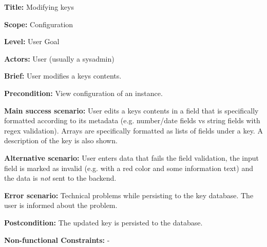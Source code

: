 
\begin{DoxyItemize}
\item {\bfseries{Title\+:}} Modifying keys
\item {\bfseries{Scope\+:}} Configuration
\item {\bfseries{Level\+:}} User Goal
\item {\bfseries{Actors\+:}} User (usually a sysadmin)
\item {\bfseries{Brief\+:}} User modifies a key\textquotesingle{}s contents.
\end{DoxyItemize}


\begin{DoxyItemize}
\item {\bfseries{Precondition\+:}} View configuration of an instance.
\item {\bfseries{Main success scenario\+:}} User edits a key\textquotesingle{}s contents in a field that is specifically formatted according to its metadata (e.\+g. number/date fields vs string fields with regex validation). Arrays are specifically formatted as lists of fields under a key. A description of the key is also shown.
\item {\bfseries{Alternative scenario\+:}} User enters data that fails the field validation, the input field is marked as invalid (e.\+g. with a red color and some information text) and the data is {\itshape not} sent to the backend.
\item {\bfseries{Error scenario\+:}} Technical problems while persisting to the key database. The user is informed about the problem.
\item {\bfseries{Postcondition\+:}} The updated key is persisted to the database.
\item {\bfseries{Non-\/functional Constraints\+:}} -\/ 
\end{DoxyItemize}